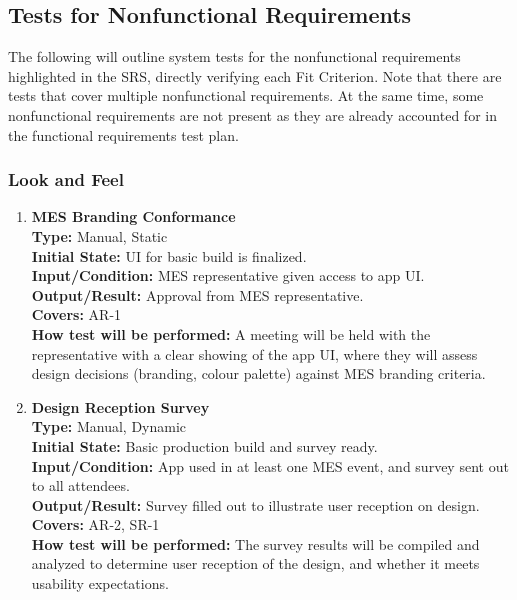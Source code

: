 \documentclass[12pt, titlepage]{article}
\begin{document}
\subsection{Tests for Nonfunctional Requirements}

The following will outline system tests for the nonfunctional requirements highlighted in the SRS, directly verifying each Fit Criterion. Note that there are tests that cover multiple nonfunctional requirements. At the same time, some nonfunctional requirements are not present as they are already accounted for in the functional requirements test plan.

\subsubsection{Look and Feel}
\begin{enumerate}[label=\bfseries LF-\arabic*:, wide=0pt]
  \item \label{test-LF1} \textbf{MES Branding Conformance}\\[2mm]
    {\bf Type:} Manual, Static\\
    {\bf Initial State:} UI for basic build is finalized.\\
    {\bf Input/Condition:} MES representative given access to app UI.\\
    {\bf Output/Result:} Approval from MES representative.\\
    {\bf Covers:} AR-1\\
    {\bf How test will be performed:} A meeting will be held with the representative with a clear showing of the app UI, where they will assess design decisions (branding, colour palette) against MES branding criteria.

  \item \label{test-LF2} \textbf{Design Reception Survey}\\[2mm]
    {\bf Type:} Manual, Dynamic\\
    {\bf Initial State:} Basic production build and survey ready.\\
    {\bf Input/Condition:} App used in at least one MES event, and survey sent out to all attendees.\\
    {\bf Output/Result:} Survey filled out to illustrate user reception on design.\\
    {\bf Covers:} AR-2, SR-1\\
    {\bf How test will be performed:} The survey results will be compiled and analyzed to determine user reception of the design, and whether it meets usability expectations.


\end{enumerate}
\end{document}
